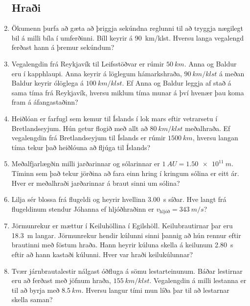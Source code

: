 \begin{enumerate}[label = \textbf{Dæmi \thechapter.\arabic*.}]

\subsection*{Hraði}

\item Ökumenn þurfa að gæta að þriggja sekúndna reglunni til að tryggja nægilegt bil á milli bíla í umferðinni. Bíll keyrir á \SI{90}{km/klst}. Hversu langa vegalengd ferðast hann á þremur sekúndum?

\item Vegalengdin frá Reykjavík til Leifsstöðvar er rúmir $\SI{50}{km}$. Anna og Baldur eru í kapphlaupi. Anna keyrir á löglegum hámarkshraða, $\SI{90}{km/klst}$ á meðan Baldur keyrir ólöglega á $\SI{100}{km/klst}$. Ef Anna og Baldur leggja af stað á sama tíma frá Reykjavík, hversu miklum tíma munar á því hvenær þau koma fram á áfangastaðinn?

\item Heiðlóan er farfugl sem kemur til Íslands í lok mars eftir vetrarsetu í Bretlandseyjum. Hún getur flogið með allt að $\SI{80}{km/klst}$ meðalhraða. Ef vegalengdin frá Bretlandseyjum til Íslands er rúmir $\SI{1500}{km}$, hversu langan tíma tekur það heiðlóuna að fljúga til Íslands?

\item Meðalfjarlægðin milli jarðarinnar og sólarinnar er $\SI{1}{AU} = \SI{1.50e11}{m}$. Tíminn sem það tekur jörðina að fara einn hring í kringum sólina er eitt ár. Hver er meðalhraði jarðarinnar á braut sinni um sólina?

\item Lilja sér blossa frá flugeldi og heyrir hvellinn \SI{3.00}{s} síðar. Hve langt frá flugeldinum stendur Jóhanna ef hljóðhraðinn er $v_{\text{hljóð}} = \SI{343}{m/s}$?

\item Jörmunrekur er mættur í Keiluhöllina í Egilshöll. Keilubrautirnar þar eru \SI{18.3}{m} langar. Jörmunrekur hendir kúlunni sinni þannig að hún rennur eftir brautinni með föstum hraða. Hann heyrir kúluna skella á keilunum \SI{2.80}{s} eftir að hann kastaði kúlunni. Hver var hraði keilukúlunnar?

\item Tvær járnbrautalestir nálgast óðfluga á sömu lestarteinunum. Báðar lestirnar eru að ferðast með jöfnum hraða, $\SI{155}{km/klst}$. Vegalengdin á milli lestanna er til að byrja með $\SI{8.5}{km}$. Hversu langur tími mun líða þar til að lestarnar skella saman?  


\end{enumerate}
